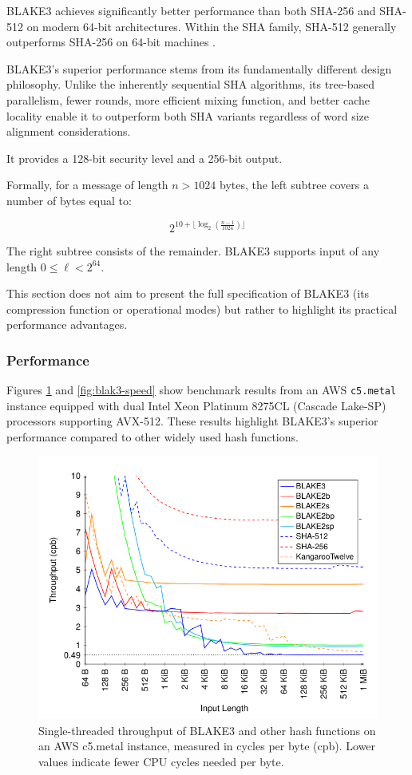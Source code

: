 BLAKE3 achieves significantly better performance than both SHA-256 and SHA-512 on modern 64-bit architectures. Within the SHA family, SHA-512 generally outperforms SHA-256 on 64-bit machines \cite{gueron2011sha}. 

BLAKE3's superior performance stems from its fundamentally different design philosophy. Unlike the inherently sequential SHA algorithms, its tree-based parallelism, fewer rounds, more efficient mixing function, and better cache locality enable it to outperform both SHA variants regardless of word size alignment considerations.

It provides a 128-bit security level and a 256-bit output.

Formally, for a message of length $n > 1024$ bytes, the left subtree covers a number of bytes equal to:

\[
2^{10 + \lfloor \log_2{\left(\frac{n-1}{1024}\right)} \rfloor}
\]

The right subtree consists of the remainder. BLAKE3 supports input of any length $0 \leq \ell < 2^{64}$.

This section does not aim to present the full specification of BLAKE3 (its compression function or operational modes) but rather to highlight its practical performance advantages.

\subsubsection{Performance}

Figures \ref{fig:blake3-thoughput-example} and \ref{fig:blak3-speed} show benchmark results from an AWS \texttt{c5.metal} instance equipped with dual Intel Xeon Platinum 8275CL (Cascade Lake-SP) processors supporting AVX-512.  
These results highlight BLAKE3's superior performance compared to other widely used hash functions.

\begin{figure}
    \centering
    \includegraphics[width=0.7\linewidth]{assets/blake3-throughput-example.png}
    \caption{Single-threaded throughput of BLAKE3 and other hash functions on an AWS c5.metal
instance, measured in cycles per byte (cpb). Lower values indicate fewer CPU cycles needed per byte.}
    \label{fig:blake3-thoughput-example}
\end{figure}

